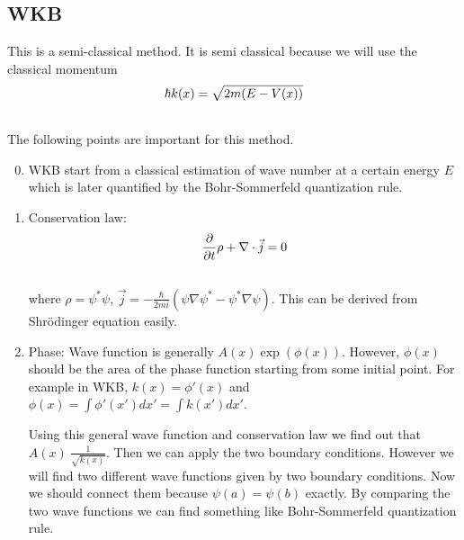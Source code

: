 \documentclass[letterpaper,10pt,english]{sphinxmanual}
\begin{document}
\subsection{WKB}
\label{approx:wkb}
This is a semi-classical method. It is semi classical because we will use the classical momentum
\begin{gather}
\begin{split}\hbar k(x) = \sqrt{2m (E - V(x))}\end{split}\notag\\\begin{split}\end{split}\notag
\end{gather}
The following points are important for this method.
\begin{enumerate}
\setcounter{enumi}{-1}
\item {} 
WKB start from a classical estimation of wave number at a certain energy $E$ which is later quantified by the Bohr-Sommerfeld quantization rule.

\item {} 
Conservation law:
\begin{gather}
\begin{split}\frac{\partial}{\partial t}\rho + \nabla \cdot \vec j = 0\end{split}\notag\\\begin{split}\end{split}\notag
\end{gather}
where $\rho = \psi^* \psi$, $\vec j = -\frac{\hbar}{2 m i} \left( \psi \nabla \psi^* - \psi^* \nabla \psi \right)$. This can be derived from Shrödinger equation easily.

\item {} 
Phase:
Wave function is generally $A(x)\exp(\phi(x))$. However, $\phi(x)$ should be the area of the phase function starting from some initial point. For example in WKB, $k(x) = \phi'(x)$ and $\phi(x) = \int \phi'(x')d x' = \int k(x') d x'$.

Using this general wave function and conservation law we find out that $A(x) ~ \frac{1}{\sqrt{k(x)}}$. Then we can apply the two boundary conditions. However we will find two different wave functions given by two boundary conditions. Now we should connect them because $\psi(a) = \psi(b)$ exactly. By comparing the two wave functions we can find something like Bohr-Sommerfeld quantization rule.


\end{enumerate}
\end{document}
